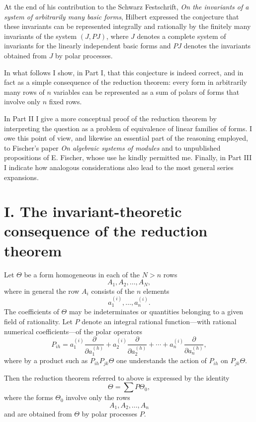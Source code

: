\documentclass[11pt]{article}
\begin{document}
At the end of his contribution to the Schwarz Festschrift, \emph{On the invariants of a system of arbitrarily many basic forms}, Hilbert expressed the conjecture that these invariants can be represented integrally and rationally by the finitely many invariants of the system \((J,PJ)\), where \(J\) denotes a complete system of invariants for the linearly independent basic forms and \(PJ\) denotes the invariants obtained from \(J\) by polar processes.

In what follows I show, in Part I, that this conjecture is indeed correct, and in fact as a simple consequence of the reduction theorem: every form in arbitrarily many rows of \(n\) variables can be represented as a sum of polars of forms that involve only \(n\) fixed rows.

In Part II I give a more conceptual proof of the reduction theorem by interpreting the question as a problem of equivalence of linear families of forms. I owe this point of view, and likewise an essential part of the reasoning employed, to Fischer's paper \emph{On algebraic systems of modules} and to unpublished propositions of E. Fischer, whose use he kindly permitted me. Finally, in Part III I indicate how analogous considerations also lead to the most general series expansions.

\section*{I. The invariant-theoretic consequence of the reduction theorem}

Let \(\Theta\) be a form homogeneous in each of the \(N>n\) rows
\[
A_1,A_2,\dots,A_N,
\]
where in general the row \(A_i\) consists of the \(n\) elements
\[
a_1^{(i)},\dots,a_n^{(i)}.
\]
The coefficients of \(\Theta\) may be indeterminates or quantities belonging to a given field of rationality. Let \(P\) denote an integral rational function---with rational numerical coefficients---of the polar operators
\[
P_{ih}
=
a_1^{(i)}\frac{\partial}{\partial a_1^{(h)}}
+
a_2^{(i)}\frac{\partial}{\partial a_2^{(h)}}
+\cdots+
a_n^{(i)}\frac{\partial}{\partial a_n^{(h)}},
\]
where by a product such as \(P_{ih}P_{jk}\Theta\) one understands the action of \(P_{ih}\) on \(P_{jk}\Theta\).

Then the reduction theorem referred to above is expressed by the identity
\[
\Theta = \sum P\Theta_0,
\tag{1}
\]
where the forms \(\Theta_0\) involve only the rows
\[
A_1,A_2,\dots,A_n
\]
and are obtained from \(\Theta\) by polar processes \(P\).
\end{document}
